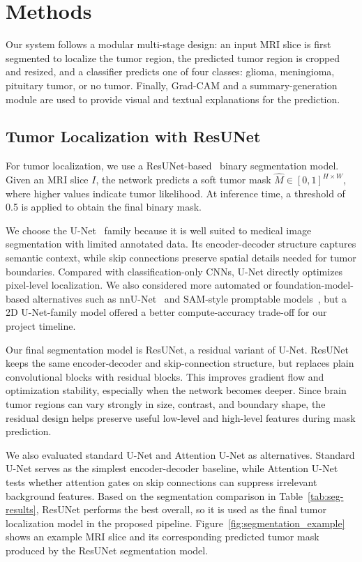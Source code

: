 \section{Methods}
\label{sec:methods}
Our system follows a modular multi-stage design: an input MRI slice is first segmented to localize the tumor region, the predicted tumor region is cropped and resized, and a classifier predicts one of four classes: glioma, meningioma, pituitary tumor, or no tumor. Finally, Grad-CAM and a summary-generation module are used to provide visual and textual explanations for the prediction.



\subsection{Tumor Localization with ResUNet}
For tumor localization, we use a ResUNet-based~\cite{zhang2018resunet} binary segmentation model. Given an MRI slice $I$, the network predicts a soft tumor mask $\hat{M} \in [0,1]^{H \times W}$, where higher values indicate tumor likelihood. At inference time, a threshold of 0.5 is applied to obtain the final binary mask.

We choose the U-Net~\cite{ronneberger2015unet} family because it is well suited to medical image segmentation with limited annotated data. Its encoder-decoder structure captures semantic context, while skip connections preserve spatial details needed for tumor boundaries. Compared with classification-only CNNs, U-Net directly optimizes pixel-level localization. We also considered more automated or foundation-model-based alternatives such as nnU-Net~\cite{isensee2021nnunet} and SAM-style promptable models~\cite{kirillov2023segment}, but a 2D U-Net-family model offered a better compute-accuracy trade-off for our project timeline.

Our final segmentation model is ResUNet, a residual variant of U-Net. ResUNet keeps the same encoder-decoder and skip-connection structure, but replaces plain convolutional blocks with residual blocks. This improves gradient flow and optimization stability, especially when the network becomes deeper. Since brain tumor regions can vary strongly in size, contrast, and boundary shape, the residual design helps preserve useful low-level and high-level features during mask prediction.

We also evaluated standard U-Net and Attention U-Net as alternatives. Standard U-Net serves as the simplest encoder-decoder baseline, while Attention U-Net tests whether attention gates on skip connections can suppress irrelevant background features. 
Based on the segmentation comparison in Table~\ref{tab:seg-results}, ResUNet performs the best overall, so it is used as the final tumor localization model in the proposed pipeline.
Figure~\ref{fig:segmentation_example} shows an example MRI slice and its corresponding predicted tumor mask produced by the ResUNet segmentation model.


